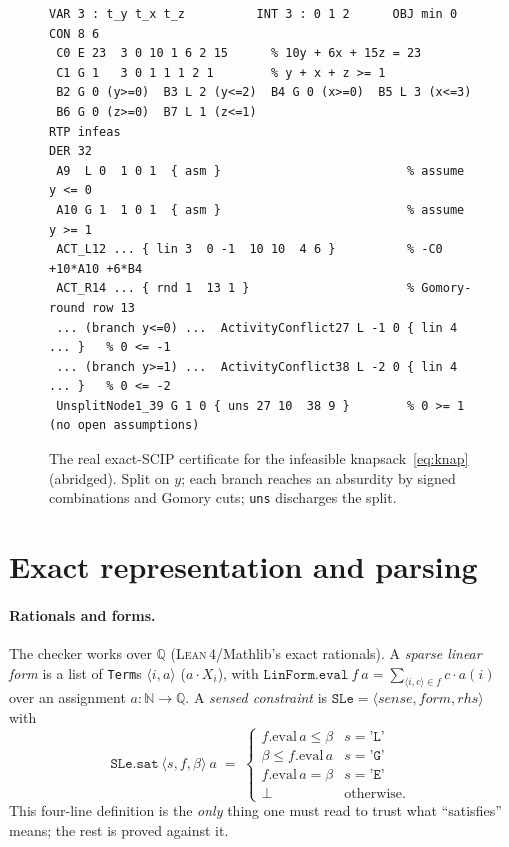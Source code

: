 \documentclass[runningheads]{llncs}
\newcommand{\code}[1]{\texttt{#1}}
\newcommand{\Q}{\mathbb{Q}}
\newcommand{\N}{\mathbb{N}}
\newcommand{\scip}{\textsc{SCIP}}
\newcommand{\lean}{\textsc{Lean\,4}}
\newcommand{\eval}{\mathrm{eval}}
\begin{document}
\begin{figure}[t]
\centering
\begin{lstlisting}
VAR 3 : t_y t_x t_z          INT 3 : 0 1 2      OBJ min 0
CON 8 6
 C0 E 23  3 0 10 1 6 2 15      % 10y + 6x + 15z = 23
 C1 G 1   3 0 1 1 1 2 1        % y + x + z >= 1
 B2 G 0 (y>=0)  B3 L 2 (y<=2)  B4 G 0 (x>=0)  B5 L 3 (x<=3)
 B6 G 0 (z>=0)  B7 L 1 (z<=1)
RTP infeas
DER 32
 A9  L 0  1 0 1  { asm }                          % assume y <= 0
 A10 G 1  1 0 1  { asm }                          % assume y >= 1
 ACT_L12 ... { lin 3  0 -1  10 10  4 6 }          % -C0 +10*A10 +6*B4
 ACT_R14 ... { rnd 1  13 1 }                      % Gomory-round row 13
 ... (branch y<=0) ...  ActivityConflict27 L -1 0 { lin 4 ... }   % 0 <= -1
 ... (branch y>=1) ...  ActivityConflict38 L -2 0 { lin 4 ... }   % 0 <= -2
 UnsplitNode1_39 G 1 0 { uns 27 10  38 9 }        % 0 >= 1  (no open assumptions)
\end{lstlisting}
\caption{The real exact-\scip{} certificate for the infeasible
knapsack~\eqref{eq:knap} (abridged). Split on $y$; each branch reaches an absurdity by
signed combinations and Gomory cuts; \code{uns} discharges the split.}
\label{fig:knap}
\end{figure}

\section{Exact representation and parsing}\label{sec:parser}

\paragraph{Rationals and forms.} The checker works over $\Q$ (\lean{}/Mathlib's exact
rationals). A \emph{sparse linear form} is a list of \code{Term}s $\langle
i,a\rangle$ ($a\cdot X_i$), with $\code{LinForm.eval}\ f\ a = \sum_{\langle i,c\rangle\in
f} c\cdot a(i)$ over an assignment $a:\N\to\Q$. A \emph{sensed constraint} is
$\code{SLe} = \langle \mathit{sense}, \mathit{form}, \mathit{rhs}\rangle$ with
\[
\code{SLe.sat}\ \langle s,f,\beta\rangle\ a \;=\;
\begin{cases}
f.\eval\,a \le \beta & s=\code{'L'}\\
\beta \le f.\eval\,a & s=\code{'G'}\\
f.\eval\,a = \beta & s=\code{'E'}\\
\bot & \text{otherwise.}
\end{cases}
\]
This four-line definition is the \emph{only} thing one must read to trust what
``satisfies'' means; the rest is proved against it.
\end{document}
